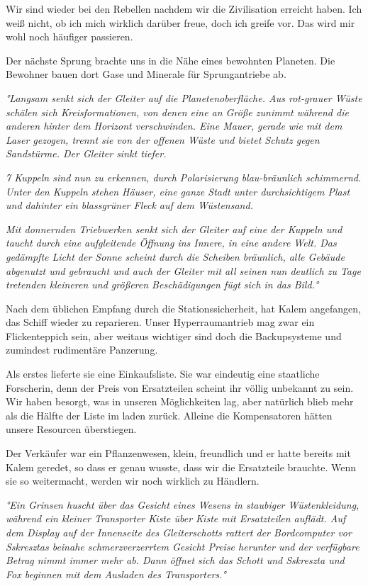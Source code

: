 \documentclass[11pt]{scrartcl}
\begin{document}
Wir sind wieder bei den Rebellen nachdem wir die Zivilisation erreicht
haben. Ich weiß nicht, ob ich mich wirklich darüber freue, doch ich
greife vor. Das wird mir wohl noch häufiger passieren.

Der nächste Sprung brachte uns in die Nähe eines bewohnten Planeten. Die
Bewohner bauen dort Gase und Minerale für Sprungantriebe ab.

\emph{°Langsam senkt sich der Gleiter auf die Planetenoberfläche. Aus
rot-grauer Wüste schälen sich Kreisformationen, von denen eine an Größe
zunimmt während die anderen hinter dem Horizont verschwinden. Eine
Mauer, gerade wie mit dem Laser gezogen, trennt sie von der offenen
Wüste und bietet Schutz gegen Sandstürme. Der Gleiter sinkt tiefer.}

\emph{7 Kuppeln sind nun zu erkennen, durch Polarisierung blau-bräunlich
schimmernd. Unter den Kuppeln stehen Häuser, eine ganze Stadt unter
durchsichtigem Plast und dahinter ein blassgrüner Fleck auf dem
Wüstensand.}

\emph{Mit donnernden Triebwerken senkt sich der Gleiter auf eine der
Kuppeln und taucht durch eine aufgleitende Öffnung ins Innere, in eine
andere Welt. Das gedämpfte Licht der Sonne scheint durch die Scheiben
bräunlich, alle Gebäude abgenutzt und gebraucht und auch der Gleiter mit
all seinen nun deutlich zu Tage tretenden kleineren und größeren
Beschädigungen fügt sich in das Bild.°}

Nach dem üblichen Empfang durch die Stationssicherheit, hat Kalem
angefangen, das Schiff wieder zu reparieren. Unser Hyperraumantrieb mag
zwar ein Flickenteppich sein, aber weitaus wichtiger sind doch die
Backupsysteme und zumindest rudimentäre Panzerung.

Als erstes lieferte sie eine Einkaufsliste. Sie war eindeutig eine
staatliche Forscherin, denn der Preis von Ersatzteilen scheint ihr
völlig unbekannt zu sein. Wir haben besorgt, was in unseren
Möglichkeiten lag, aber natürlich blieb mehr als die Hälfte der Liste im
laden zurück. Alleine die Kompensatoren hätten unsere Resourcen
überstiegen.

Der Verkäufer war ein Pflanzenwesen, klein, freundlich und er hatte
bereits mit Kalem geredet, so dass er genau wusste, dass wir die
Ersatzteile brauchte. Wenn sie so weitermacht, werden wir noch wirklich
zu Händlern.

\emph{°Ein Grinsen huscht über das Gesicht eines Wesens in staubiger
Wüstenkleidung, während ein kleiner Transporter Kiste über Kiste mit
Ersatzteilen auflädt. Auf dem Display auf der Innenseite des
Gleiterschotts rattert der Bordcomputer vor Sskresztas beinahe
schmerzverzerrtem Gesicht Preise herunter und der verfügbare Betrag
nimmt immer mehr ab. Dann öffnet sich das Schott und Sskreszta und Fox
beginnen mit dem Ausladen des Transporters.°}
\end{document}
